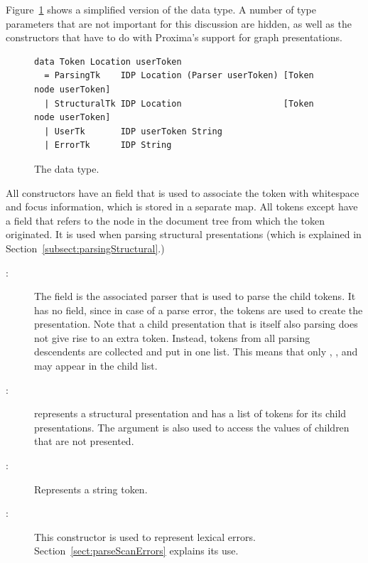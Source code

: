 \documentclass[12pt]{article}
\begin{document}
Figure~\ref{fig:tokenType} shows a simplified version of the  data type. A number of type parameters that are not important for this discussion are hidden, as well as the constructors that have to do with Proxima's support for graph presentations. 

\begin{figure}
\begin{center}
\begin{verbatim}
data Token Location userToken 
  = ParsingTk    IDP Location (Parser userToken) [Token node userToken]
  | StructuralTk IDP Location                    [Token node userToken]
  | UserTk       IDP userToken String 
  | ErrorTk      IDP String 
\end{verbatim}
\caption{The  data type.} \label{fig:tokenType} 
\end{center}
\end{figure}


All constructors have an  field that is used to associate the token with whitespace and focus information, which is stored in a separate map. All tokens except  have a  field that refers to the node in the document tree from which the token originated. It is used when parsing structural presentations (which is explained in Section~\ref{subsect:parsingStructural}.)

\begin{description}
\item[:] The field  is the associated parser that is used to parse the child tokens. It has no  field, since in case of a parse error, the tokens are used to create the presentation. Note that a child presentation that is itself also parsing does not give rise to an extra  token. Instead, tokens from all parsing descendents are collected and put in one list. This means that only , , and  may appear in the child list. \\
\item[:] represents a structural presentation and has a list of tokens for its child presentations. The  argument is also used to access the values of children that are not presented. 
\item[:] Represents a string token.  \\
\item[:] This constructor is used to represent lexical errors. Section~\ref{sect:parseScanErrors} explains its use. \\
\end{description}
\end{document}
